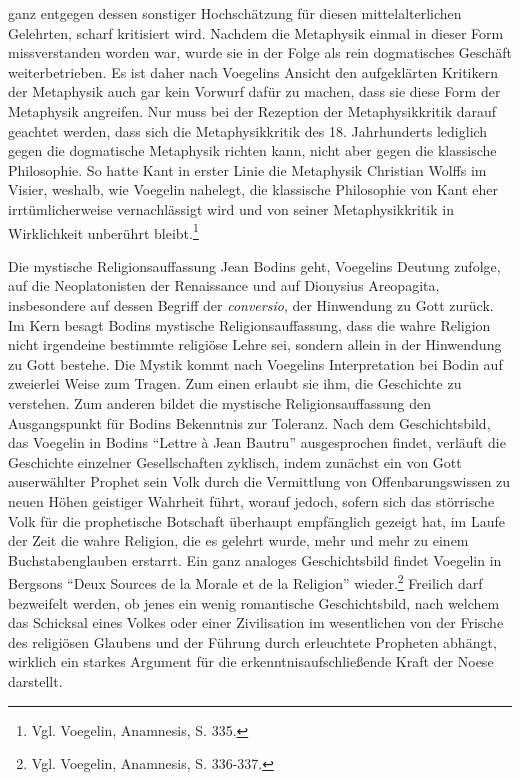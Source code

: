 ganz entgegen dessen sonstiger Hochschätzung für diesen mittelalterlichen
Gelehrten, scharf kritisiert wird. Nachdem die Metaphysik einmal in dieser
Form missverstanden worden war, wurde sie in der Folge als rein dogmatisches
Geschäft weiterbetrieben. Es ist daher nach Voegelins Ansicht den aufgeklärten
Kritikern der Metaphysik auch gar kein Vorwurf dafür zu machen, dass sie diese
Form der Metaphysik angreifen. Nur muss bei der Rezeption der Metaphysikkritik
darauf geachtet werden, dass sich die Metaphysikkritik des 18. Jahrhunderts
lediglich gegen die dogmatische Metaphysik richten kann, nicht aber gegen die
klassische Philosophie. So hatte Kant in erster Linie die Metaphysik Christian
Wolffs im Visier, weshalb, wie Voegelin nahelegt, die klassische Philosophie
von Kant eher irrtümlicherweise vernachlässigt wird und von seiner
Metaphysikkritik in Wirklichkeit unberührt bleibt.\footnote{Vgl. Voegelin,
  Anamnesis, S. 335.}

Die mystische Religionsauf\/fassung Jean Bodins geht, Voegelins Deutung
zufolge, auf die Neoplatonisten der Renaissance und auf Dionysius Areopagita,
insbesondere auf dessen Begriff der {\it conversio}, der Hinwendung zu Gott
zurück. Im Kern besagt Bodins mystische Religionsauf\/fassung, dass die wahre
Religion nicht irgendeine bestimmte religiöse Lehre sei, sondern allein in der
Hinwendung zu Gott bestehe. Die Mystik kommt nach Voegelins Interpretation bei
Bodin auf zweierlei Weise zum Tragen. Zum einen erlaubt sie ihm, die
Geschichte zu verstehen. Zum anderen bildet die mystische Religionsauf\/fassung
den Ausgangspunkt für Bodins Bekenntnis zur Toleranz. Nach dem Geschichtsbild,
das Voegelin in Bodins "`Lettre à Jean Bautru"' ausgesprochen findet, verläuft
die Geschichte einzelner Gesellschaften zyklisch, indem zunächst ein von Gott
auserwählter Prophet sein Volk durch die Vermittlung von Offenbarungswissen zu
neuen Höhen geistiger Wahrheit führt, worauf jedoch, sofern sich das
störrische Volk für die prophetische Botschaft überhaupt empfänglich gezeigt
hat, im Laufe der Zeit die wahre Religion, die es gelehrt wurde, mehr und mehr
zu einem Buchstabenglauben erstarrt. Ein ganz analoges Geschichtsbild findet
Voegelin in Bergsons "`Deux Sources de la Morale et de la Religion"'
wieder.\footnote{Vgl. Voegelin, Anamnesis, S. 336-337.} Freilich darf
bezweifelt werden, ob jenes ein wenig romantische Geschichtsbild, nach welchem
das Schicksal eines Volkes oder einer Zivilisation im wesentlichen von der
Frische des religiösen Glaubens und der Führung durch erleuchtete Propheten
abhängt, wirklich ein starkes Argument für die erkenntnisaufschließende Kraft
der Noese darstellt.

